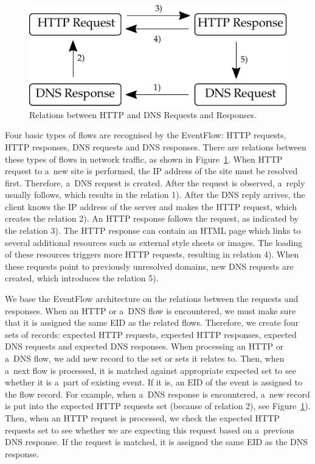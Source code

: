 \begin{figure}[!tb]
    \centering 
    \includegraphics{figures/paper-eventflow/dependencies}
    \caption{Relations between HTTP and DNS Requests and Responses.}
    \label{fig:eventflow-relations}
\end{figure}

Four basic types of flows are recognised by the EventFlow: HTTP requests, HTTP responses, DNS requests and DNS responses. There are relations between these types of flows in network traffic, as shown in Figure~\ref{fig:eventflow-relations}. When HTTP request to a~new site is performed, the IP address of the site must be resolved first. Therefore, a~DNS request is created. After the request is observed, a~reply usually follows, which results in the relation 1). After the DNS reply arrives, the client knows the IP address of the server and makes the HTTP request, which creates the relation 2). An HTTP response follows the request, as indicated by the relation 3). The HTTP response can contain an HTML page which links to several additional resources such as external style sheets or images. The loading of these resources triggers more HTTP requests, resulting in relation 4). When these requests point to previously unresolved domains, new DNS requests are created, which introduces the relation 5).

We base the EventFlow architecture on the relations between the requests and responses. When an HTTP or a~DNS flow is encountered, we must make sure that it is assigned the same EID as the related flows. Therefore, we create four sets of records: expected HTTP requests, expected HTTP responses, expected DNS requests and expected DNS responses. When processing an HTTP or a~DNS flow, we add new record to the set or sets it relates to. Then, when a~next flow is processed, it is matched against appropriate expected set to see whether it is a~part of existing event. If it is, an EID of the event is assigned to the flow record. For example, when a~DNS response is encountered, a~new record is put into the expected HTTP requests set (because of relation 2), see Figure~\ref{fig:eventflow-relations}). Then, when an HTTP request is processed, we check the expected HTTP requests set to see whether we are expecting this request based on a~previous DNS response. If the request is matched, it is assigned the same EID as the DNS response. 

